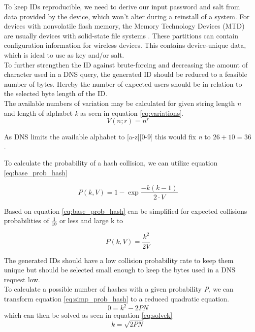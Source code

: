         To keep IDs reproducible, we need to derive our input password and salt from data provided by the device, which won't alter during a reinstall of a system. For devices with nonvolatile flash memory, the Memory Technology Devices (MTD) are usually devices with solid-state file systems \cite{giometti_mtd_2017} \cite{woodhouse_memory_nodate}. These partitions can contain configuration information for wireless devices. This contains device-unique data, which is ideal to use as key and/or salt.\\
        
        To further strengthen the ID against brute-forcing and decreasing the amount of character used in a DNS query, the generated ID should be reduced to a feasible number of bytes. Hereby the number of expected users should be in relation to the selected byte length of the ID.\\
        The available numbers of variation may be calculated for given string length \textit{n} and length of alphabet \textit{k} as seen in equation \ref{eq:variations}.
        \begin{equation}
            \label{eq:variations}
            V(n;r) = n^{r}
        \end{equation}

        As DNS limits the available alphabet to [a-z][0-9] this would fix \textit{n} to $26 + 10 = 36$.
        
        To calculate the probability of a hash collision, we can utilize equation \ref{eq:base_prob_hash}
        
        \begin{equation}
             \label{eq:base_prob_hash}
             P(k,V) = 1 - \exp{\frac{-k(k-1)}{2 \cdot V}}
        \end{equation}
     
        Based on  \cite{preshing_hash_2011} equation \ref{eq:base_prob_hash} can be simplified for expected collisions probabilities of $\frac{1}{10}$ or less and large k to
     
        \begin{equation}
            \label{eq:simp_prob_hash}
            P(k,V) = \frac{k^2}{2V} 
        \end{equation}
        
        The generated IDs should have a low collision probability rate to keep them unique but should be selected small enough to keep the bytes used in a DNS request low. \\
        To calculate a possible number of hashes with a given probability \textit{P}, we can transform equation \ref{eq:simp_prob_hash} to a reduced quadratic equation.
        \begin{equation*}
            0 = k^2 - 2PN
        \end{equation*}
        which can then be solved as seen in equation \ref{eq:solvek}
        \begin{equation}
            \label{eq:solvek}
            k = \sqrt{2PN}
        \end{equation}
        
